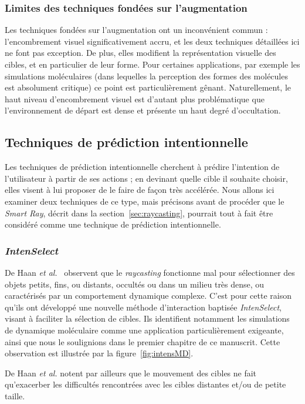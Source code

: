 	\subsubsection{Limites des techniques fondées sur l'augmentation}
	Les techniques fondées sur l'augmentation ont un inconvénient commun : l'encombrement visuel significativement accru, et les deux techniques détaillées ici ne font pas exception. De plus, elles modifient la représentation visuelle des cibles, et en particulier de leur forme. Pour certaines applications, par exemple les simulations moléculaires (dans lequelles la perception des formes des molécules est absolument critique) ce point est particulièrement gênant. Naturellement, le haut niveau d'encombrement visuel est d'autant plus problématique que l'environnement de départ est dense et présente un haut degré d'occultation.

	\subsection{Techniques de prédiction intentionnelle}
	Les techniques de prédiction intentionnelle cherchent à prédire l'intention de l'utilisateur à partir de ses actions ; en \og devinant \fg{} quelle cible il souhaite choisir, elles visent à lui proposer de le faire de façon très accélérée. Nous allons ici examiner deux techniques de ce type, mais précisons avant de procéder que le \emph{Smart Ray}, décrit dans la section~\ref{sec:raycasting}, pourrait tout à fait être considéré comme une technique de prédiction intentionnelle.
	
	\subsubsection{\emph{IntenSelect}}
	\label{sub:intenSelect}
	De Haan \emph{et al.}~\cite{de2005intenselect} observent que le \emph{raycasting} fonctionne mal pour sélectionner des objets petits, fins, ou distants, occultés ou dans un milieu très dense, ou caractérisés par un comportement dynamique complexe. C'est pour cette raison qu'ils ont développé une nouvelle méthode d'interaction baptisée \emph{IntenSelect}, visant à faciliter la sélection de cibles. Ils identifient notamment les simulations de dynamique moléculaire comme une application particulièrement exigeante, ainsi que nous le soulignions dans le premier chapitre de ce manuscrit. Cette observation est illustrée par la figure~\ref{fig:intensMD}.
	
	De Haan \emph{et al.} notent par ailleurs que le mouvement des cibles ne fait qu'exacerber les difficultés rencontrées avec les cibles distantes et/ou de petite taille.
	
